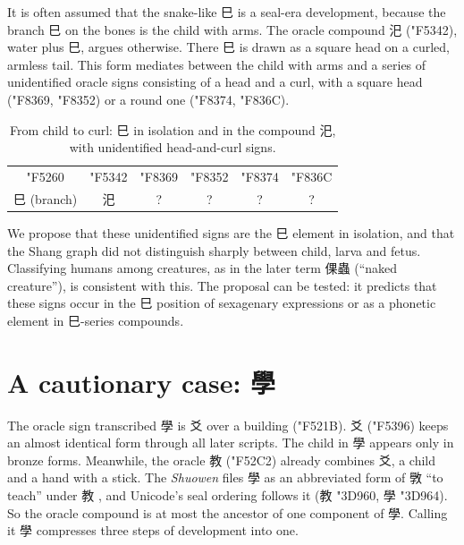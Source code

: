 \documentclass[11pt,a4paper]{article}
\newcommand{\og}[1]{{\oraclefont\char"#1}}
\newcommand{\sg}[1]{{\sealfont\char"#1}}
\newcommand{\bigog}[1]{{\oraclefont\fontsize{26}{28}\selectfont\char"#1}}
\begin{document}
It is often assumed that the snake-like 巳 is a seal-era development, because the branch 巳 on the bones is the child with arms. The oracle compound 汜 (\og{F5342}), water plus 巳, argues otherwise. There 巳 is drawn as a square head on a curled, armless tail. This form mediates between the child with arms and a series of unidentified oracle signs consisting of a head and a curl, with a square head (\og{F8369}, \og{F8352}) or a round one (\og{F8374}, \og{F836C}).

\begin{table}[h]\centering
\caption{From child to curl: 巳 in isolation and in the compound 汜, with unidentified head-and-curl signs.}
\begin{tabular}{cccccc}\toprule
\bigog{F5260} & \bigog{F5342} & \bigog{F8369} & \bigog{F8352} & \bigog{F8374} & \bigog{F836C}\\
巳 (branch) & 汜 & ? & ? & ? & ?\\\bottomrule
\end{tabular}
\end{table}

We propose that these unidentified signs are the 巳 element in isolation, and that the Shang graph did not distinguish sharply between child, larva and fetus. Classifying humans among creatures, as in the later term 倮蟲 (``naked creature''), is consistent with this. The proposal can be tested: it predicts that these signs occur in the 巳 position of sexagenary expressions or as a phonetic element in 巳-series compounds.

\section{A cautionary case: 學}
The oracle sign transcribed 學 is 爻 over a building (\og{F521B}). 爻 (\og{F5396}) keeps an almost identical form through all later scripts. The child in 學 appears only in bronze forms. Meanwhile, the oracle 教 (\og{F52C2}) already combines 爻, a child and a hand with a stick. The \emph{Shuowen} files 學 as an abbreviated form of 斆 ``to teach'' under 教 \cite{shuowen}, and Unicode's seal ordering follows it (教 \sg{3D960}, 學 \sg{3D964}). So the oracle compound is at most the ancestor of one component of 學. Calling it 學 compresses three steps of development into one.
\end{document}
